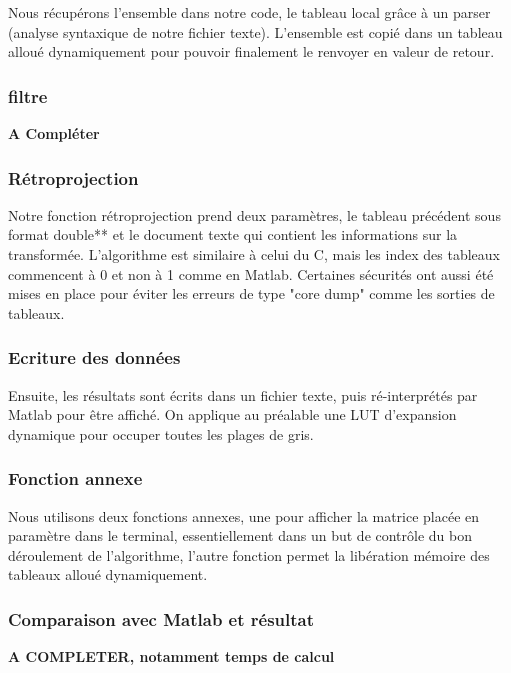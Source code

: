 \documentclass[conference]{IEEEtran}
\begin{document}
Nous récupérons l'ensemble dans notre code, le tableau local grâce à un parser (analyse syntaxique de notre fichier texte). L'ensemble est copié dans un tableau alloué dynamiquement pour pouvoir finalement le renvoyer en valeur de retour.

\subsubsection{filtre }

\textbf{A Compléter}

\subsubsection{Rétroprojection }

Notre fonction rétroprojection prend deux paramètres, le tableau précédent sous format double** et le document texte qui contient les informations sur la transformée.
L'algorithme est similaire à celui du C, mais les index des tableaux commencent à 0 et non à 1 comme en Matlab. Certaines sécurités ont aussi été mises en place pour éviter les erreurs de type "core dump" comme les sorties de tableaux.


\subsubsection{Ecriture des données }

Ensuite, les résultats sont écrits dans un fichier texte, puis ré-interprétés par Matlab pour être affiché. On applique au préalable une LUT d'expansion dynamique pour occuper toutes les plages de gris.

\subsubsection{Fonction annexe }

Nous utilisons deux fonctions annexes, une pour afficher la matrice placée en paramètre dans le terminal, essentiellement dans un but de contrôle du bon déroulement de l'algorithme, l'autre fonction permet la libération mémoire des tableaux alloué dynamiquement.

\subsubsection{Comparaison avec Matlab et résultat }



\textbf{A COMPLETER, notamment temps de calcul}
\end{document}
